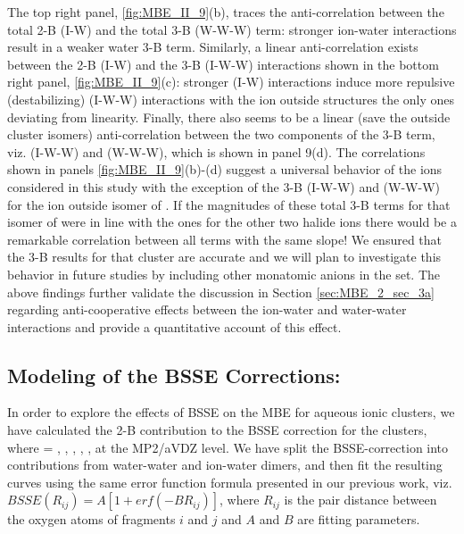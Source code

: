 \documentclass[11pt, proquest]{uwthesis}[2020/02/24]
\let\ce\ch
\begin{document}
\par The top right panel, \ref{fig:MBE_II_9}(b), traces the anti-correlation between the total 2-B (I-W) and the total 3-B (W-W-W) term: stronger ion-water interactions result in a weaker water 3-B term. Similarly, a linear anti-correlation exists between the 2-B (I-W) and the 3-B (I-W-W) interactions shown in the bottom right panel, \ref{fig:MBE_II_9}(c): stronger (I-W) interactions induce more repulsive (destabilizing) (I-W-W) interactions with the \ce{X^-} ion outside structures the only ones deviating from linearity. Finally, there also seems to be a linear (save the \ce{X^-} outside cluster isomers) anti-correlation between the two components of the 3-B term, viz. (I-W-W) and (W-W-W), which is shown in panel 9(d). The correlations shown in panels \ref{fig:MBE_II_9}(b)-(d) suggest a universal behavior of the ions considered in this study with the exception of the 3-B (I-W-W) and (W-W-W) for the ion outside isomer of \ce{Cl^-}. If the magnitudes of these total 3-B terms for that isomer of \ce{Cl^-} were in line with the ones for the other two halide ions there would be a remarkable correlation between all terms with the same slope! We ensured that the 3-B results for that cluster are accurate and we will plan to investigate this behavior in future studies by including other monatomic anions in the set. The above findings further validate the discussion in Section \ref{sec:MBE_2_sec_3a} regarding anti-cooperative effects between the ion-water and water-water interactions and provide a quantitative account of this effect.

\subsection{Modeling of the BSSE Corrections:}
\par In order to explore the effects of BSSE on the MBE for aqueous ionic clusters, we have calculated the 2-B contribution to the BSSE correction for the \ce{Z^{+/-}(H2O)9} clusters, where \ce{Z} = \ce{Li^+}, \ce{K^+}, \ce{Cs^+}, \ce{Cl^-}, \ce{Br^-}, \ce{I^-} at the MP2/aVDZ level. We have split the BSSE-correction into contributions from water-water and ion-water dimers, and then fit the resulting curves using the same error function formula presented in our previous work, viz. $BSSE(R_{ij})=A[1+erf(-BR_{ij})]$, where $R_{ij}$ is the pair distance between the oxygen atoms of fragments $i$ and $j$ and $A$ and $B$ are fitting parameters.


\end{document}
